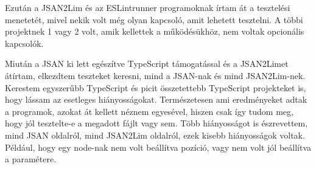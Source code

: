 \noindent

Ezután a JSAN2Lim és az ESLintrunner programoknak írtam át a tesztelési menetetét, mivel nekik volt még olyan kapcsoló, amit lehetett tesztelni. A többi projektnek 1 vagy 2 volt, amik kellettek a működésükhöz, nem voltak opcionális kapcsolók.

\noindent

Miután a JSAN ki lett egészítve TypeScript támogatással és a JSAN2Limet átírtam, elkezdtem teszteket keresni, mind a JSAN-nak és mind JSAN2Lim-nek.
Kerestem egyszerűbb TypeScript és picit összetettebb TypeScript projekteket is, hogy lássam az esetleges hiányosságokat.
Természetesen ami eredményeket adtak a programok, azokat át kellett néznem egyesével, hiszen csak így tudom meg, hogy jól tesztelte-e a megadott fájlt vagy sem.
Több hiányosságot is észrevettem, mind JSAN oldalról, mind JSAN2Lim oldalról, ezek kisebb hiányosságok voltak.
Például, hogy egy node-nak nem volt beállítva pozíció, vagy nem volt jól beállítva a paramétere.

